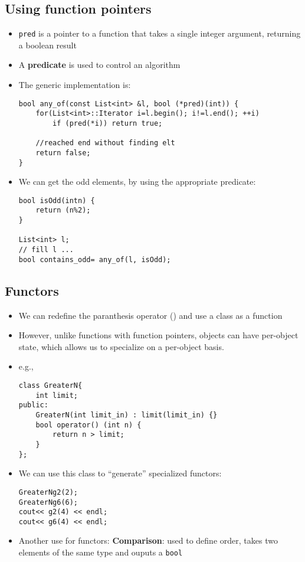 \subsection{Using function pointers}
\begin{itemize}
	\item \lstinline[style=C++]{pred} is a pointer to a function that takes a single integer argument, returning a boolean result
	\item A \textbf{predicate} is used to control an algorithm
	\item The generic implementation is:
\begin{lstlisting}[style=C++]
bool any_of(const List<int> &l, bool (*pred)(int)) {
	for(List<int>::Iterator i=l.begin(); i!=l.end(); ++i)
		if (pred(*i)) return true;

	//reached end without finding elt
	return false;
}
\end{lstlisting}
	\item We can get the odd elements, by using the appropriate predicate:
\begin{lstlisting}[style=C++]
bool isOdd(intn) {
	return (n%2);
}

List<int> l;
// fill l ...
bool contains_odd= any_of(l, isOdd);
\end{lstlisting}
\end{itemize}

\subsection{Functors}
\begin{itemize}
	\item We can redefine the paranthesis operator () and use a class as a function
	\item However, unlike functions with function pointers, objects can have per-object state, which allows us to specialize on a per-object basis.
	\item e.g.,
\begin{lstlisting}[style=C++]
class GreaterN{
	int limit;
public:
	GreaterN(int limit_in) : limit(limit_in) {}
	bool operator() (int n) {
		return n > limit;
	}
};
\end{lstlisting}
	\item We can use this class to ``generate'' specialized functors:
\begin{lstlisting}[style=C++]
GreaterNg2(2);
GreaterNg6(6);
cout<< g2(4) << endl;
cout<< g6(4) << endl;
\end{lstlisting}
	\item Another use for functors: \textbf{Comparison}: used to define order, takes two elements of the same type and ouputs a \lstinline[style=C++]{bool}
\end{itemize}